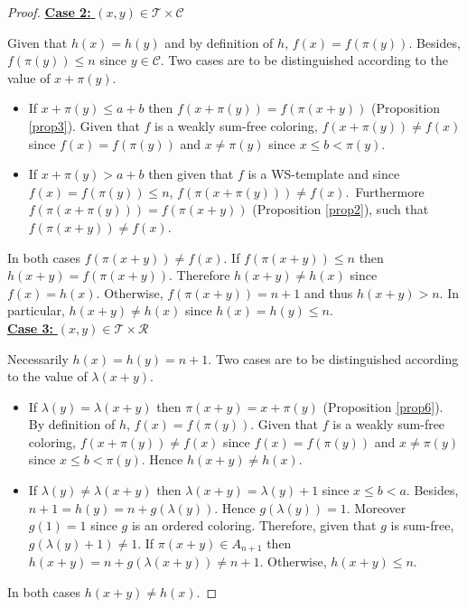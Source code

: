 \documentclass[final,onefignum,onetabnum]{siamart190516}
\begin{document}
\begin{proof}
\noindent \underline{\textbf{Case 2:} \((x,y) \in \mathcal{T} \times \mathcal{C}\)}
\par
Given that \(h(x) = h(y)\) and by definition of \(h\), \(f(x) = f(\pi(y))\). Besides, \(f(\pi(y)) \leqslant n\) since
\(y \in \mathcal{C}\). Two cases are to be distinguished according to the value of \(x + \pi(y)\).
\begin{itemize}
\item \begin{sloppypar}
	If \(x + \pi(y) \leqslant a + b\) then \(f(x + \pi(y)) = f(\pi(x + y))\) (Proposition \ref{prop3}). Given that \(f\) is
	a weakly sum-free coloring, \(f(x+\pi(y)) \neq f(x)\) since \(f(x)=f(\pi(y))\) and \(x \neq \pi(y)\) since
	\({x \leqslant b < \pi(y)}\).
	\end{sloppypar}
\item \begin{sloppypar}
	If \(x+\pi(y)> a+b\) then given that \(f\) is a WS-template and since \({f(x) = f(\pi(y)) \leqslant n}\),
	\({f(\pi(x+\pi(y))) \neq f(x)}\).~Furthermore \({f(\pi(x+\pi(y))) = f(\pi(x+y))}\) (Proposition \ref{prop2}), such that
	\({f(\pi(x+ y)) \neq f(x)}\).
	\end{sloppypar}
\end{itemize}
\par
In both cases \(f(\pi(x+y)) \neq f(x)\). If  \(f(\pi(x+y)) \leqslant n\) then \(h(x+y) = f(\pi(x+y))\). Therefore
\(h(x+y) \neq h(x)\) since \(f(x) = h(x)\). Otherwise, \(f(\pi(x+y)) = n + 1\) and thus \(h(x+y) > n\). In particular,
\(h(x + y) \neq h(x)\) since \(h(x) = h(y) \leqslant n\). \\

\noindent \underline{\textbf{Case 3:} \((x,y) \in \mathcal{T} \times \mathcal{R}\)}
\par
Necessarily \(h(x) = h(y) = n + 1\). Two cases are to be distinguished according to the value of \(\lambda(x+y)\).
\begin{itemize}
\item If \(\lambda(y)=\lambda(x+y)\) then \(\pi(x + y) = x + \pi(y)\) (Proposition \ref{prop6}). By definition of
	\(h\), \(f(x) = f(\pi(y))\). Given that \(f\) is a weakly sum-free coloring, \(f(x + \pi(y)) \neq f(x)\) since
	\(f(x) = f(\pi(y))\) and \(x \neq \pi(y)\) since \({x \leqslant b < \pi(y)}\). Hence \(h(x + y) \neq h(x)\).
\item If \(\lambda(y) \neq \lambda(x + y)\) then \(\lambda(x + y) = \lambda(y) + 1\) since \(x \leqslant b < a\).
	Besides, \(n + 1 = h(y) = n +  g(\lambda(y))\). Hence \(g(\lambda(y)) = 1\). Moreover \(g(1) = 1\) since \(g\)
	is an ordered coloring. Therefore, given that \(g\) is sum-free, \(g(\lambda(y) + 1) \neq 1\). If \(\pi(x + y) \in
	A_{n + 1}\) then \(h(x + y) = n + g(\lambda(x + y)) \neq n + 1\). Otherwise, \(h(x + y) \leqslant n\).
\end{itemize}
\par
In both cases \(h(x + y) \neq h(x)\).


\end{proof}
\end{document}
